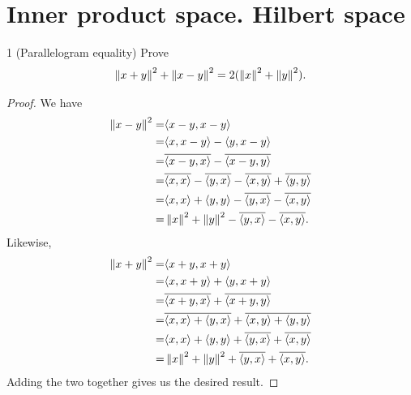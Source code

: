 \section{Inner product space. Hilbert space}


\begin{exercise}{1 (Parallelogram equality)}
Prove
\begin{align*}
    \left\lVert x+y\right\rVert^2 + \left\lVert x-y\right\rVert^2 
    = 2(\left\lVert x\right\rVert^2 + \left\lVert y\right\rVert^2).
\end{align*}
\end{exercise}
\begin{proof}
We have
\begin{align*}
    \left\lVert x-y\right\rVert^2
    =& \langle x-y, x-y\rangle\\
    =& \langle x, x-y\rangle - \langle y, x-y\rangle\\
    =& \overline{\langle x-y, x\rangle} - \overline{\langle x-y,y\rangle}\\
    =& \overline{\langle x, x\rangle} - \overline{\langle y, x\rangle} - \overline{\langle x,y\rangle} + \overline{\langle y,y\rangle}\\
    =& \langle x, x\rangle + \langle y,y\rangle - \overline{\langle y, x\rangle} - \overline{\langle x,y\rangle} \\
    =& \left\lVert x\right\rVert^2 +\left\lVert y\right\rVert^2 - \overline{\langle y, x\rangle} - \overline{\langle x,y\rangle}.
\end{align*}
Likewise,
\begin{align*}
    \left\lVert x+y\right\rVert^2
    =& \langle x+y, x+y\rangle\\
    =& \langle x, x+y\rangle + \langle y, x+y\rangle\\
    =& \overline{\langle x+y, x\rangle} + \overline{\langle x+y,y\rangle}\\
    =& \overline{\langle x, x\rangle + \langle y, x\rangle} + \overline{\langle x,y\rangle + \langle y,y\rangle}\\
    =& \langle x, x\rangle + \langle y,y\rangle + \overline{\langle y, x\rangle} + \overline{\langle x,y\rangle} \\
    =& \left\lVert x\right\rVert^2 +\left\lVert y\right\rVert^2 + \overline{\langle y, x\rangle} + \overline{\langle x,y\rangle}.
\end{align*}
Adding the two together gives us the desired result.
\end{proof}

